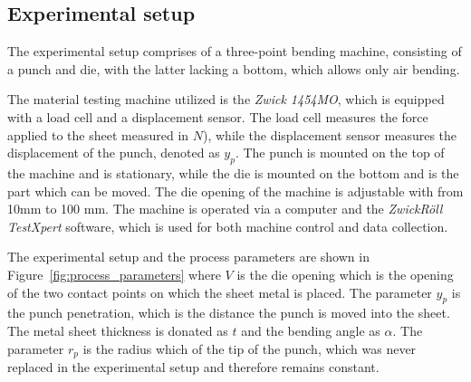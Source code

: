 %
%

\subsection{Experimental setup}\label{subsec:experimental-setup}
The experimental setup comprises of a three-point bending machine, consisting
of a punch and die, with the latter lacking a bottom, which allows only air bending.

The material testing machine utilized is the \textit{Zwick 1454MO}, which is
equipped with a load cell and a displacement sensor.
The load cell measures the force applied to the sheet measured in $N$), while the
displacement sensor measures the displacement of the punch, denoted as $y_p$.
The punch is mounted on the top of the machine and is stationary, while the
die is mounted on the bottom and is the part which can be moved.
The die opening of the machine is adjustable with from 10mm to 100 mm.
The machine is operated via a computer and the \textit{ZwickRöll TestXpert} software,
which is used for both machine control and data collection.

The experimental setup and the process parameters are shown in
Figure~\ref{fig:process_parameters} where $V$ is the die opening which is the
opening of the two contact points on which the sheet metal is placed.
The parameter $y_p$ is the punch penetration, which is the distance the punch is moved
into the sheet.
The metal sheet thickness is donated as $t$ and the bending angle as $\alpha$.
The parameter $r_p$ is the radius which of the tip of the punch, which was never
replaced in the experimental setup and therefore remains constant.

